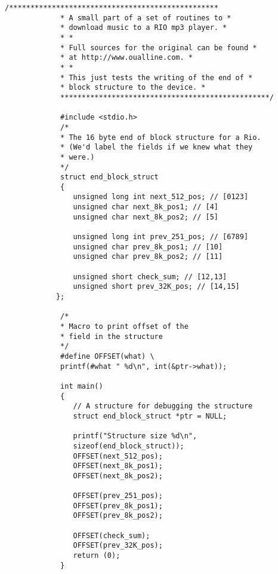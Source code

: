 \begin{LTR}
        \begin{lstlisting}[style=C++Style]
             /*************************************************
             * A small part of a set of routines to *
             * download music to a RIO mp3 player. *
             * *
             * Full sources for the original can be found *
             * at http://www.oualline.com. *
             * *
             * This just tests the writing of the end of *
             * block structure to the device. *
             *************************************************/

             #include <stdio.h>
             /*
             * The 16 byte end of block structure for a Rio.
             * (We'd label the fields if we knew what they
             * were.)
             */
             struct end_block_struct
             {
             	unsigned long int next_512_pos; // [0123]
             	unsigned char next_8k_pos1; // [4]
             	unsigned char next_8k_pos2; // [5]

             	unsigned long int prev_251_pos; // [6789]
             	unsigned char prev_8k_pos1; // [10]
             	unsigned char prev_8k_pos2; // [11]

             	unsigned short check_sum; // [12,13]
             	unsigned short prev_32K_pos; // [14,15]
            };

             /*
             * Macro to print offset of the
             * field in the structure
             */
             #define OFFSET(what) \
             printf(#what " %d\n", int(&ptr->what));

             int main()
             {
             	// A structure for debugging the structure
             	struct end_block_struct *ptr = NULL;

             	printf("Structure size %d\n",
             	sizeof(end_block_struct));
             	OFFSET(next_512_pos);
             	OFFSET(next_8k_pos1);
             	OFFSET(next_8k_pos2);

             	OFFSET(prev_251_pos);
             	OFFSET(prev_8k_pos1);
             	OFFSET(prev_8k_pos2);

             	OFFSET(check_sum);
             	OFFSET(prev_32K_pos);
            	return (0);
             }
        \end{lstlisting}
\end{LTR}
